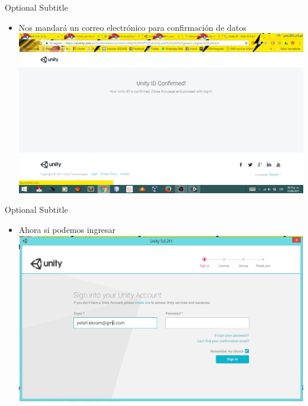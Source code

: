 \documentclass{beamer}
\begin{document}
\begin{frame}{07}{Optional Subtitle}
  \begin{itemize}
  \item {
    Nos mandará un correo electrónico para confirmación de datos
  }
  \includegraphics[width=\linewidth]{image/IU07}

  \end{itemize}
\end{frame}

\begin{frame}{08}{Optional Subtitle}
  \begin{itemize}
  \item {
    Ahora si podemos ingresar
  }
  \includegraphics[width=\linewidth]{image/IU08}

  \end{itemize}
\end{frame}
\end{document}
